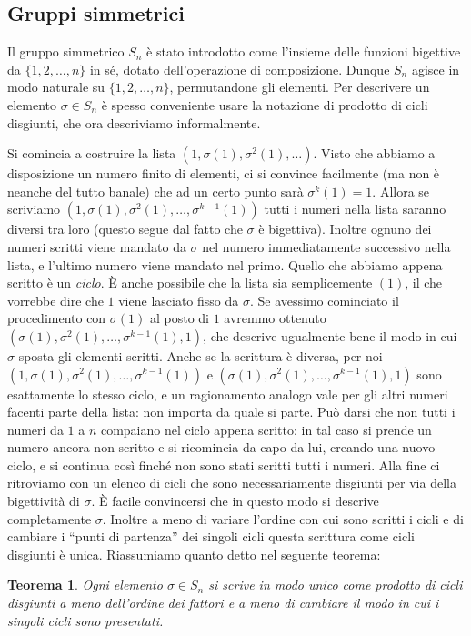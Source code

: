 \documentclass[11pt]{article}
\theoremstyle{plain}
\newtheorem{thm}{Teorema}[section]
\theoremstyle{definition}
\theoremstyle{remark}
\begin{document}
\subsection{Gruppi simmetrici}
Il gruppo simmetrico $S_n$ è stato introdotto come l'insieme delle funzioni bigettive da $\{1,2,\dots,n\}$ in sé, dotato dell'operazione di composizione.
Dunque $S_n$ agisce in modo naturale su $\{1,2,\dots,n\}$, permutandone gli elementi. Per descrivere un elemento $\sigma \in S_n$
è spesso conveniente usare la notazione di prodotto di cicli disgiunti, che ora descriviamo informalmente.

Si comincia a costruire la lista $(1, \sigma(1), \sigma^2(1), \dots)$. Visto che abbiamo a disposizione un numero finito di elementi,
ci si convince facilmente (ma non è neanche del tutto banale) che ad un certo punto sarà $\sigma^k(1) = 1$. Allora se scriviamo $(1, \sigma(1), \sigma^2(1), \dots, \sigma^{k-1}(1))$ tutti i numeri nella lista
saranno diversi tra loro (questo segue dal fatto che $\sigma$ è bigettiva). Inoltre ognuno dei numeri scritti viene mandato da $\sigma$
nel numero immediatamente successivo nella lista, e l'ultimo numero viene mandato nel primo. Quello che abbiamo appena scritto è un \emph{ciclo}.
\`E anche possibile che la lista sia semplicemente $(1)$, il che vorrebbe dire che $1$ viene lasciato fisso da $\sigma$.
Se avessimo cominciato il procedimento con $\sigma(1)$ al posto di $1$ avremmo ottenuto $(\sigma(1), \sigma^2(1), \dots, \sigma^{k-1}(1), 1)$, che
descrive ugualmente bene il modo in cui $\sigma$ sposta gli elementi scritti. Anche se la scrittura è diversa, per noi
$(1, \sigma(1), \sigma^2(1), \dots, \sigma^{k-1}(1))$ e $(\sigma(1), \sigma^2(1), \dots, \sigma^{k-1}(1), 1)$ sono esattamente lo stesso ciclo,
e un ragionamento analogo vale per gli altri numeri facenti parte della lista: non importa da quale si parte.
Può darsi che non tutti i numeri da $1$ a $n$ compaiano nel ciclo appena scritto: in tal caso si prende un numero ancora non scritto e si ricomincia da capo
da lui, creando una nuovo ciclo, e si continua così finché non sono stati scritti tutti i numeri.
Alla fine ci ritroviamo con un elenco di cicli che sono necessariamente disgiunti per via della bigettività di $\sigma$.
\`E facile convincersi che in questo modo si descrive completamente $\sigma$. Inoltre a meno di variare
l'ordine con cui sono scritti i cicli e di cambiare i ``punti di partenza'' dei singoli cicli questa scrittura come cicli disgiunti è unica.
Riassumiamo quanto detto nel seguente teorema:

\begin{thm}
Ogni elemento $\sigma \in S_n$ si scrive in modo unico come prodotto di cicli disgiunti a meno dell'ordine dei fattori e a meno di
cambiare il modo in cui i singoli cicli sono presentati.
\end{thm}
\end{document}
